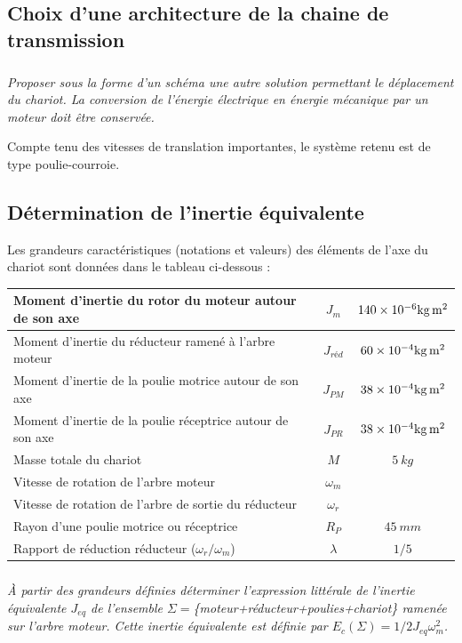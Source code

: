 \documentclass[10pt,fleqn]{article} %
\begin{document}
\begin{multicols}{2}
\subsection*{Choix d'une architecture de la chaine de transmission}
\subparagraph{}
\textit{Proposer sous la forme d'un schéma une autre solution permettant le déplacement du chariot. La conversion de l'énergie électrique en énergie mécanique par un moteur doit être conservée.}

Compte tenu des vitesses de translation importantes, le système retenu est de type poulie-courroie.

\subsection*{Détermination de l'inertie équivalente} 
Les grandeurs caractéristiques (notations et valeurs) des éléments de l'axe du chariot sont données dans le tableau ci-dessous :
\begin{center}
\begin{tabular}{|p{3cm}|c|c|}
\hline
Moment d'inertie du rotor du moteur autour de son axe&	$J_m$ & $\num{140d-6}\si{kg.m^2}$ \\ \hline
Moment d'inertie du réducteur ramené à l'arbre moteur&	$J_{réd}$ & $\num{60d-4}\si{kg.m^2}$ \\ \hline
Moment d'inertie de la poulie motrice autour de son axe&	$J_{PM}$	&$ \num{38d-4}\si{kg.m^2}$ \\ \hline
Moment d'inertie de la poulie réceptrice autour de son axe&	$J_{PR}$ & $\num{38d-4}\si{kg.m^2}$ \\ \hline
Masse totale du chariot	&$M$ &$\SI{5}{kg}$ \\ \hline
Vitesse de rotation de l'arbre moteur &$\omega_m$ &  \\ \hline
Vitesse de rotation de l'arbre de sortie du réducteur	&$\omega_r$&  \\ \hline
Rayon d'une poulie motrice ou réceptrice	& $R_P$ &$\SI{45}{mm}$ \\ \hline
Rapport de réduction réducteur ($\omega_r/\omega_m$)	& $\lambda$	&$1/5$ \\ \hline
\end{tabular}
\end{center}

\subparagraph{}
\textit{À partir des grandeurs définies déterminer l'expression littérale de l'inertie équivalente $J_{eq}$ de l'ensemble $\Sigma=$\{moteur+réducteur+poulies+chariot\} ramenée sur l'arbre moteur. Cette inertie équivalente est définie par $E_c (\Sigma)=1/2 J_{eq} \omega_m^2$.}


\end{multicols}
\end{document}
